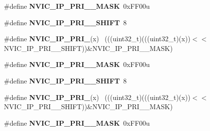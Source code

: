 \begin{DoxyCompactItemize}
\item 
\hypertarget{group___n_v_i_c___register___masks_ga2eade430981b179a17768ad0d883efa4}{}\#define {\bfseries N\+V\+I\+C\+\_\+\+I\+P\+\_\+\+P\+R\+I\+\_\+\_\+\+M\+A\+S\+K}~0x\+F\+F00u\label{group___n_v_i_c___register___masks_ga2eade430981b179a17768ad0d883efa4}

\item 
\hypertarget{group___n_v_i_c___register___masks_ga95c8fd016e14f74793bc8f6f684bf9ba}{}\#define {\bfseries N\+V\+I\+C\+\_\+\+I\+P\+\_\+\+P\+R\+I\+\_\+\_\+\+S\+H\+I\+F\+T}~8\label{group___n_v_i_c___register___masks_ga95c8fd016e14f74793bc8f6f684bf9ba}

\item 
\hypertarget{group___n_v_i_c___register___masks_ga87ea337a3015c64ada3fcf554d6bfd1b}{}\#define {\bfseries N\+V\+I\+C\+\_\+\+I\+P\+\_\+\+P\+R\+I\+\_}(x)                                              ~(((uint32\+\_\+t)(((uint32\+\_\+t)(x))$<$$<$N\+V\+I\+C\+\_\+\+I\+P\+\_\+\+P\+R\+I\+\_\+\_\+\+S\+H\+I\+F\+T))\&N\+V\+I\+C\+\_\+\+I\+P\+\_\+\+P\+R\+I\+\_\+\_\+\+M\+A\+S\+K)\label{group___n_v_i_c___register___masks_ga87ea337a3015c64ada3fcf554d6bfd1b}

\item 
\hypertarget{group___n_v_i_c___register___masks_ga42b43819366cf7b9ff66a3d10552d4d9}{}\#define {\bfseries N\+V\+I\+C\+\_\+\+I\+P\+\_\+\+P\+R\+I\+\_\+\_\+\+M\+A\+S\+K}~0x\+F\+F00u\label{group___n_v_i_c___register___masks_ga42b43819366cf7b9ff66a3d10552d4d9}

\item 
\hypertarget{group___n_v_i_c___register___masks_gaf8c324fcf89139439812f93d33586403}{}\#define {\bfseries N\+V\+I\+C\+\_\+\+I\+P\+\_\+\+P\+R\+I\+\_\+\_\+\+S\+H\+I\+F\+T}~8\label{group___n_v_i_c___register___masks_gaf8c324fcf89139439812f93d33586403}

\item 
\hypertarget{group___n_v_i_c___register___masks_ga6c54eb09f817e9e014ad7050fde90a7c}{}\#define {\bfseries N\+V\+I\+C\+\_\+\+I\+P\+\_\+\+P\+R\+I\+\_}(x)                                            ~(((uint32\+\_\+t)(((uint32\+\_\+t)(x))$<$$<$N\+V\+I\+C\+\_\+\+I\+P\+\_\+\+P\+R\+I\+\_\+\_\+\+S\+H\+I\+F\+T))\&N\+V\+I\+C\+\_\+\+I\+P\+\_\+\+P\+R\+I\+\_\+\_\+\+M\+A\+S\+K)\label{group___n_v_i_c___register___masks_ga6c54eb09f817e9e014ad7050fde90a7c}

\item 
\hypertarget{group___n_v_i_c___register___masks_gab5fb432f1775a7bf1f198328f66009d3}{}\#define {\bfseries N\+V\+I\+C\+\_\+\+I\+P\+\_\+\+P\+R\+I\+\_\+\_\+\+M\+A\+S\+K}~0x\+F\+F00u\label{group___n_v_i_c___register___masks_gab5fb432f1775a7bf1f198328f66009d3}


\end{DoxyCompactItemize}
